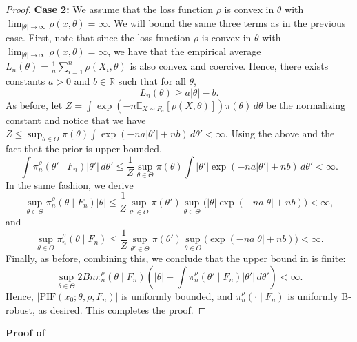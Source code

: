 \documentclass[11pt, oneside]{amsart}
\theoremstyle{definition}   %
\newcommand{\E}{\mathbb{E}}
\newcommand{\R}{\mathbb{R}}
\newcommand{\loss}{\rho}
\newcommand{\mposterior}{\pi_n^{\loss}}
\begin{document}
\begin{proof}
    \textbf{Case 2:} We assume that the loss function \(\loss\) is convex in \( \theta \) with \( \lim_{| \theta |\rightarrow \infty} \loss(x, \theta) = \infty \). We will bound the same three terms as in the previous case. 
    First, note that since the loss function \(\loss\) is convex in \( \theta \) with \( \lim_{| \theta |\rightarrow \infty} \loss(x, \theta) = \infty \), we have that the empirical average \( L_n(\theta) = \tfrac{1}{n} \sum_{i=1}^n \loss (X_i, \theta) \) is also convex and coercive. Hence, there exists constants \( a > 0\) and  \(b \in \R\) such that for all \(\theta\),
    \[
    L_n(\theta) \geq a |\theta|- b.
    \]
    As before, let \( Z = \int \exp \left ( - n \E_{X \sim F_n} [\loss (X,\theta)] \right ) \pi(\theta) \, d\theta \) be the normalizing constant and notice that we have \( Z \leq \sup_{\theta \in \Theta} \pi(\theta) \int  \exp(-n a | \theta' | +nb) \, d\theta'  < \infty\).
    Using the above and the fact that the prior is upper-bounded,
    \[
        \int \mposterior(\theta' \mid F_n) |\theta' | \, d\theta' \leq
        \frac{1}{Z} \sup_{\theta \in \Theta} \pi(\theta)  \int |\theta'| \exp(-n a | \theta' | +nb) \, d\theta'  < \infty.
    \]
    In the same fashion, we derive
    \[
        \sup_{\theta \in \Theta} \mposterior(\theta \mid F_n) \left | \theta \right | \leq
        \frac{1}{Z} \sup_{\theta' \in \Theta} \pi(\theta') \sup_{\theta \in \Theta} \bigl ( |\theta| \exp(-n a | \theta | +nb) \bigr ) < \infty,
    \]
    and
    \[
        \sup_{\theta \in \Theta} \mposterior(\theta \mid F_n) \leq
        \frac{1}{Z} \sup_{\theta' \in \Theta} \pi(\theta') \sup_{\theta \in \Theta} \bigl (  \exp(-n a | \theta | +nb) \bigr ) < \infty. 
    \]
    Finally, as before, combining this, we conclude that the upper bound in  is finite:
    \[
    \sup_{\theta \in \Theta} 2B n \mposterior(\theta \mid F_n) \left ( | \theta | + \int \mposterior(\theta' \mid F_n) |\theta'| \, d\theta' \right ) < \infty.
    \]
    Hence, \( \left |\textrm{PIF}(x_0; \theta,\rho, F_n) \right | \) is uniformly bounded, and \( \mposterior(\cdot \mid F_n) \) is uniformly B-robust, as desired. This completes the proof.
\end{proof}
%
%
\noindent \textbf{Proof of }
\end{document}
